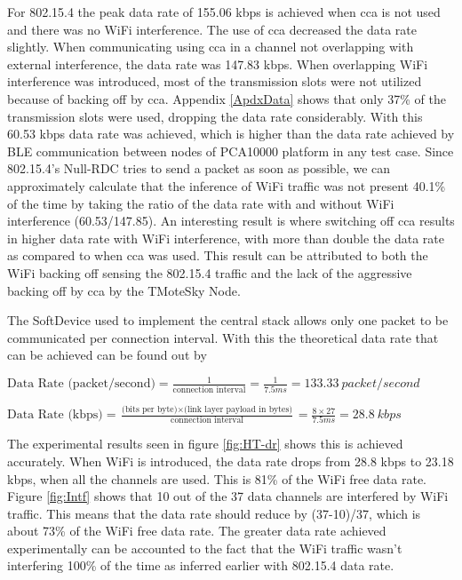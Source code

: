 For 802.15.4 the peak data rate of 155.06 kbps is achieved when \gls{cca} is not used and there was no WiFi interference. The use of \gls{cca} decreased the data rate slightly. When communicating using \gls{cca} in a channel not overlapping with external interference, the data rate was 147.83 kbps. When overlapping WiFi interference was introduced, most of the transmission slots were not utilized because of backing off by \gls{cca}. Appendix \ref{ApdxData} shows that only 37\% of the transmission slots were used, dropping the data rate considerably. With this 60.53 kbps data rate was achieved, which is higher than the data rate achieved by BLE communication between nodes of PCA10000 platform in any test case. Since 802.15.4's Null-RDC tries to send a packet as soon as possible, we can approximately calculate that the inference of WiFi traffic was not present 40.1\% of the time by taking the ratio of the data rate with and without WiFi interference (60.53/147.85). An interesting result is where switching off \gls{cca} results in higher data rate with WiFi interference, with more than double the data rate as compared to when \gls{cca} was used. This result can be attributed to both the WiFi backing off sensing the 802.15.4 traffic and the lack of the aggressive backing off by \gls{cca} by the TMoteSky Node. %

The SoftDevice used to implement the central stack allows only one packet to be communicated per connection interval. With this the theoretical data rate that can be achieved can be found out by

\vspace{5pt}
$\mbox{Data Rate  (packet/second)}=\frac{1}{\mbox{connection interval}}=\frac{1}{7.5ms}=133.33\:packet/second$

\vspace{15 pt}
$\mbox{Data Rate (kbps)}=\frac{\mbox{(bits per byte)}\times\mbox{(link layer payload in bytes)}}{\mbox{connection interval}}=\frac{8\times27}{7.5ms}=28.8\:kbps$
\vspace{10 pt}

The experimental results seen in figure \ref{fig:HT-dr} shows this is achieved accurately. When WiFi is introduced, the data rate drops from 28.8 kbps to 23.18 kbps, when all the channels are used. This is 81\% of the WiFi free data rate. Figure \ref{fig:Intf} shows that 10 out of the 37 data channels are interfered by WiFi traffic. This means that the data rate should reduce by (37-10)/37, which is about 73\% of the WiFi free data rate. The greater data rate achieved experimentally can be accounted to the fact that the WiFi traffic wasn't interfering 100\% of the time as inferred earlier with 802.15.4 data rate. 

